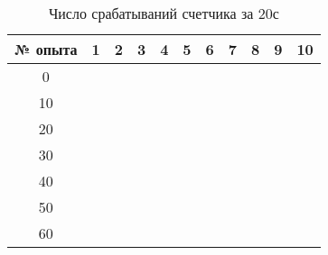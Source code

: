 \documentclass[a4paper,12pt]{article} %
\begin{document}
\begin{table}[h]
\centering
\caption{Число срабатываний счетчика за 20с}
\label{table 1}
\renewcommand{\tabcolsep}{4mm}
\begin{tabular}{|c|l|l|l|l|l|l|l|l|l|l|}
\hline
№ опыта & \multicolumn{1}{c|}{1} & \multicolumn{1}{c|}{2} & \multicolumn{1}{c|}{3} & \multicolumn{1}{c|}{4} & \multicolumn{1}{c|}{5} & \multicolumn{1}{c|}{6} & \multicolumn{1}{c|}{7} & \multicolumn{1}{c|}{8} & \multicolumn{1}{c|}{9} & \multicolumn{1}{c|}{10} \\ \hline
0       &                        &                        &                        &                        &                        &                        &                        &                        &                        &                         \\ \hline
10      &                        &                        &                        &                        &                        &                        &                        &                        &                        &                         \\ \hline
20      &                        &                        &                        &                        &                        &                        &                        &                        &                        &                         \\ \hline
30      &                        &                        &                        &                        &                        &                        &                        &                        &                        &                         \\ \hline
40      &                        &                        &                        &                        &                        &                        &                        &                        &                        &                         \\ \hline
50      &                        &                        &                        &                        &                        &                        &                        &                        &                        &                         \\ \hline
60      &                        &                        &                        &                        &                        &                        &                        &                        &                        &                         \\ \hline

\end{tabular}
\end{table}
\end{document}

